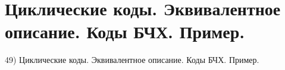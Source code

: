 \section{
 Циклические коды. Эквивалентное описание. Коды БЧХ. Пример.
}

49) Циклические коды. Эквивалентное описание. Коды БЧХ. Пример.
